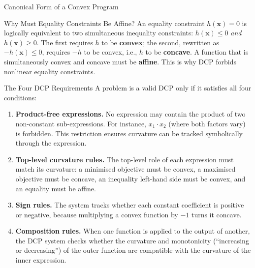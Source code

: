 \documentclass[aspectratio=169,10pt]{beamer}
\begin{document}
\begin{frame}[allowframebreaks]{Canonical Form of a Convex Program}
  \begin{alertblock}{Why Must Equality Constraints Be Affine?}
    An equality constraint $h(\mathbf{x}) = 0$ is logically equivalent
    to two simultaneous inequality constraints: $h(\mathbf{x}) \leq 0$
    \emph{and} $h(\mathbf{x}) \geq 0$.  The first requires $h$ to be
    \textbf{convex}; the second, rewritten as $-h(\mathbf{x}) \leq 0$,
    requires $-h$ to be convex, i.e., $h$ to be \textbf{concave}.  A
    function that is simultaneously convex and concave must be
    \textbf{affine}.  This is why DCP forbids nonlinear equality
    constraints.
  \end{alertblock}

  \begin{block}{The Four DCP Requirements}
    A problem is a valid DCP only if it satisfies all four conditions:
    \begin{enumerate}
      \item \textbf{Product-free expressions.}  No expression may
            contain the product of two non-constant sub-expressions.
            For instance, $x_1 \cdot x_2$ (where both factors vary)
            is forbidden.  This restriction ensures curvature can be
            tracked symbolically through the expression.
      \item \textbf{Top-level curvature rules.}  The top-level role of
            each expression must match its curvature: a minimised
            objective must be convex, a maximised objective must be
            concave, an inequality left-hand side must be convex, and
            an equality must be affine.
      \item \textbf{Sign rules.}  The system tracks whether each
            constant coefficient is positive or negative, because
            multiplying a convex function by $-1$ turns it concave.
      \item \textbf{Composition rules.}  When one function is applied
            to the output of another, the DCP system checks whether
            the curvature and monotonicity (``increasing or
            decreasing'') of the outer function are compatible with the
            curvature of the inner expression.
    \end{enumerate}
  \end{block}

\end{frame}
\end{document}

